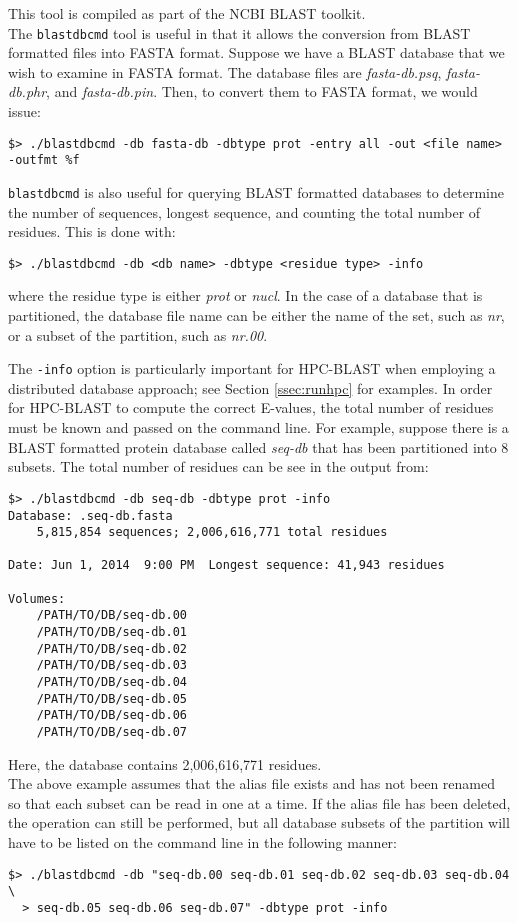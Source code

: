 \documentclass[10pt]{article}
\begin{document}
 This tool is compiled as part of the NCBI BLAST toolkit.\\

The \verb^blastdbcmd^ tool is useful in that it allows the conversion from BLAST formatted files into FASTA format.  Suppose we have a BLAST database that we wish to examine in FASTA format.  The database files are
\emph{fasta-db.psq}, \emph{fasta-db.phr}, and \emph{fasta-db.pin}.  Then, to convert them to FASTA format, we would issue:
\begin{verbatim}
$> ./blastdbcmd -db fasta-db -dbtype prot -entry all -out <file name> -outfmt %f
\end{verbatim}

\noindent \verb^blastdbcmd^ is also useful for querying BLAST formatted databases to determine the number of sequences, longest sequence, and counting the total number of residues.  This is done with:
\begin{verbatim}
$> ./blastdbcmd -db <db name> -dbtype <residue type> -info
\end{verbatim}
\noindent where the residue type is either \emph{prot} or \emph{nucl}.  In the case of a database that is partitioned, the database file name can be either the name of the set, such as \emph{nr}, or a subset of the partition,
such as \emph{nr.00}.

\noindent The \verb^-info^ option is particularly important for HPC-BLAST when employing a distributed database approach; see Section \ref{ssec:runhpc} for examples. In order for HPC-BLAST to compute the correct E-values, the total number of
residues must be known and passed on the command line.  For example, suppose there is a BLAST formatted protein database called \emph{seq-db} that has been partitioned into 8 subsets. The total number of residues can be see in the output from:
\begin{verbatim}
$> ./blastdbcmd -db seq-db -dbtype prot -info
Database: .seq-db.fasta
	5,815,854 sequences; 2,006,616,771 total residues

Date: Jun 1, 2014  9:00 PM	Longest sequence: 41,943 residues

Volumes:
	/PATH/TO/DB/seq-db.00
	/PATH/TO/DB/seq-db.01
	/PATH/TO/DB/seq-db.02
	/PATH/TO/DB/seq-db.03
	/PATH/TO/DB/seq-db.04
	/PATH/TO/DB/seq-db.05
	/PATH/TO/DB/seq-db.06
	/PATH/TO/DB/seq-db.07
\end{verbatim}
\noindent Here, the database contains 2,006,616,771 residues.\\

 The above example assumes that the alias file exists and has not been renamed so that each subset can be read in one at a time. If the alias file has been deleted, the operation can still be performed, but all database subsets
of the partition will have to be listed on the command line in the following manner:
\begin{verbatim}
$> ./blastdbcmd -db "seq-db.00 seq-db.01 seq-db.02 seq-db.03 seq-db.04 \
  > seq-db.05 seq-db.06 seq-db.07" -dbtype prot -info
\end{verbatim}
\end{document}
